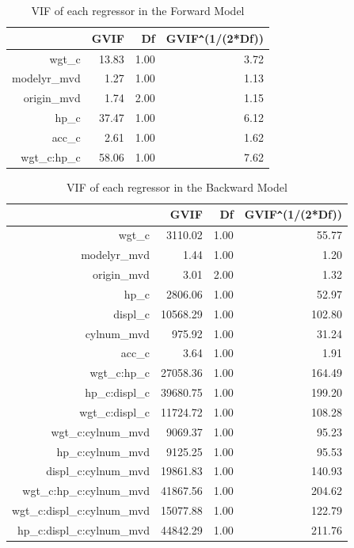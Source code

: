 \documentclass{article}
\begin{document}
\begin{table}[ht]
\centering
\begin{tabular}{rrrr}
  \hline
 & GVIF & Df & GVIF\verb|^|(1/(2*Df)) \\ 
  \hline
wgt\_c & 13.83 & 1.00 & 3.72 \\ 
  modelyr\_mvd & 1.27 & 1.00 & 1.13 \\ 
  origin\_mvd & 1.74 & 2.00 & 1.15 \\ 
  hp\_c & 37.47 & 1.00 & 6.12 \\ 
  acc\_c & 2.61 & 1.00 & 1.62 \\ 
  wgt\_c:hp\_c & 58.06 & 1.00 & 7.62 \\ 
   \hline
\end{tabular}
\caption{VIF of each regressor in the Forward Model}
\label{tab:forwardmodelvif}
\end{table}

\begin{table}[ht]
\centering
\begin{tabular}{rrrr}
  \hline
 & GVIF & Df & GVIF\verb|^|(1/(2*Df)) \\ 
  \hline
wgt\_c & 3110.02 & 1.00 & 55.77 \\ 
  modelyr\_mvd & 1.44 & 1.00 & 1.20 \\ 
  origin\_mvd & 3.01 & 2.00 & 1.32 \\ 
  hp\_c & 2806.06 & 1.00 & 52.97 \\ 
  displ\_c & 10568.29 & 1.00 & 102.80 \\ 
  cylnum\_mvd & 975.92 & 1.00 & 31.24 \\ 
  acc\_c & 3.64 & 1.00 & 1.91 \\ 
  wgt\_c:hp\_c & 27058.36 & 1.00 & 164.49 \\ 
  hp\_c:displ\_c & 39680.75 & 1.00 & 199.20 \\ 
  wgt\_c:displ\_c & 11724.72 & 1.00 & 108.28 \\ 
  wgt\_c:cylnum\_mvd & 9069.37 & 1.00 & 95.23 \\ 
  hp\_c:cylnum\_mvd & 9125.25 & 1.00 & 95.53 \\ 
  displ\_c:cylnum\_mvd & 19861.83 & 1.00 & 140.93 \\ 
  wgt\_c:hp\_c:cylnum\_mvd & 41867.56 & 1.00 & 204.62 \\ 
  wgt\_c:displ\_c:cylnum\_mvd & 15077.88 & 1.00 & 122.79 \\ 
  hp\_c:displ\_c:cylnum\_mvd & 44842.29 & 1.00 & 211.76 \\ 
   \hline
\end{tabular}
\caption{VIF of each regressor in the Backward Model}
\label{tab:backwardmodelvif}
\end{table}
\end{document}

